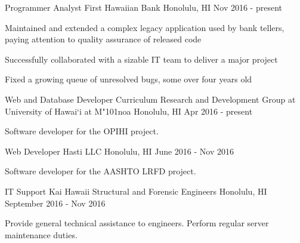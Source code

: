 \begin{cventries}
   	\cventry
    {Programmer Analyst}
    {First Hawaiian Bank}
    {Honolulu, HI}
    {Nov 2016 - present}
    {
        \begin{cvitems}
            \item {Maintained and extended a complex legacy application used by bank tellers, paying attention to quality assurance of released code}
            \item {Successfully collaborated with a sizable IT team to deliver a major project}
            \item {Fixed a growing queue of unresolved bugs, some over four years old}
        \end{cvitems}
    }
	\cventry
	{Web and Database Developer}
	{Curriculum Research and Development Group at University of Hawai`i at M{\char"101}noa}
	{Honolulu, HI}
	{Apr 2016 - present}
	{
		\begin{cvitems}
			\item {Software developer for the OPIHI project.}
		\end{cvitems}
	}
    \cventry
    {Web Developer}
    {Hasti LLC}
    {Honolulu, HI}
    {June 2016 - Nov 2016}
    {
        \begin{cvitems}
            \item {Software developer for the AASHTO LRFD project.}
        \end{cvitems}
    }
    \cventry
    {IT Support}
    {Kai Hawaii Structural and Forensic Engineers}
    {Honolulu, HI}
    {September 2016 - Nov 2016}
    {
	    \begin{cvitems}
		    \item{Provide general technical assistance to engineers. Perform regular server maintenance duties.}	
	    \end{cvitems}	
    }
	

\end{cventries}
